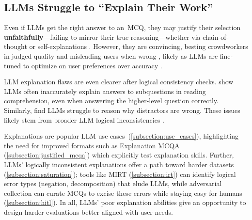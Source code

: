 \subsection{LLMs Struggle to ``Explain Their Work''} \label{subsection:explanations}


Even if LLMs get the right answer to an~MCQ, they may justify their selection \textbf{unfaithfully}---failing to mirror their true reasoning---whether via chain-of-thought \cite{lyu2023faithful, turpin2024language} or self-explanations \cite{kim2024can, madsen2024self}.
However, they are convincing, besting crowdworkers in judged quality \cite{mishra-etal-2024-characterizing} and misleading users when wrong \cite{si2023large}, likely as LLMs are fine-tuned to optimize on user preferences over accuracy \cite{wen2024language}.

LLM explanation flaws are even clearer after logical consistency checks.
\citet{kawabata2023evaluating} show LLMs often inaccurately explain answers to subquestions in reading comprehension, even when answering the higher-level question correctly.
Similarly, \citet{balepur-etal-2024-easy} find LLMs struggle to reason why distractors are wrong.
These issues likely stem from broader LLM logical inconsistencies \cite{liu2024aligning, varshney2024investigating}.

Explanations are popular LLM use cases~(\cref{subsection:use_cases}), highlighting the need for improved \mcqa formats such as Explanation MCQA (\cref{subsection:justified_mcqa}) which explicitly test explanation skills.
Further, LLMs' logically inconsistent explanations offer a path toward harder datasets (\cref{subsection:saturation}); tools like MIRT (\cref{subsection:irt}) can identify logical error types (negation, decomposition) that elude LLMs, while adversarial collection can curate MCQs to excise these errors while staying easy for humans (\cref{subsection:hitl}).
In all, LLMs' poor explanation abilities give an opportunity to design harder \mcqa evaluations better aligned with user needs.




